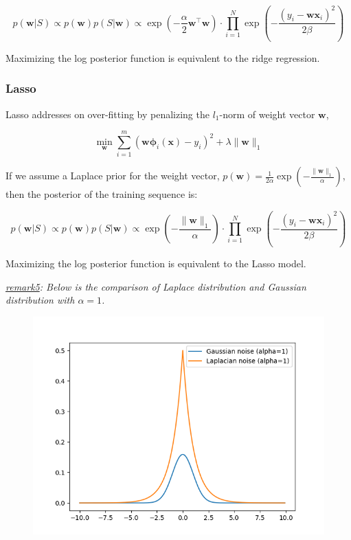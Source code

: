 \documentclass{article}
\begin{document}
	\begin{equation}
	p(\mathbf{w}|S) \propto p(\mathbf{w}) p(S|\mathbf{w}) \propto \exp \left( -\frac{\alpha}{2} \mathbf{w}^\top \mathbf{w} \right) \cdot \prod_{i=1}^N \exp \left( -\frac{(y_i-\mathbf{wx}_i)^2}{2\beta} \right) 
	\end{equation}
	
Maximizing the log posterior function is equivalent to the ridge regression.
	
	
\subsubsection{Lasso}

	Lasso addresses on over-fitting by penalizing the $l_1$-norm of weight vector $\mathbf{w}$,
		
	\begin{equation*}
	\min_\mathbf{w} \sum_{i=1}^m (\mathbf{w\phi}_i(\mathbf{x}) - y_i)^2 + \lambda\|\mathbf{w}\|_1
	\end{equation*}
	
	If we assume a Laplace prior for the weight vector, $p(\mathbf{w})=\frac{1}{2\alpha} \exp \left( -\frac{\|\mathbf{w}\|_1}{\alpha} \right)$, then the posterior of the training sequence is:
	
	\begin{equation}
	p(\mathbf{w}|S) \propto p(\mathbf{w}) p(S|\mathbf{w}) \propto \exp \left( -\frac{\|\mathbf{w}\|_1}{\alpha} \right) \cdot \prod_{i=1}^N \exp \left( -\frac{(y_i-\mathbf{wx}_i)^2}{2\beta} \right)
	\end{equation}

Maximizing the log posterior function is equivalent to the Lasso model.

	\textit{\underline{remark5}: Below is the comparison of Laplace distribution and Gaussian distribution with $\alpha=1$.}
	\begin{figure}[!htbp]
	\begin{center}
	\includegraphics[scale=.4]{C4-1.png}	
	\end{center}
	\end{figure}
\end{document}
